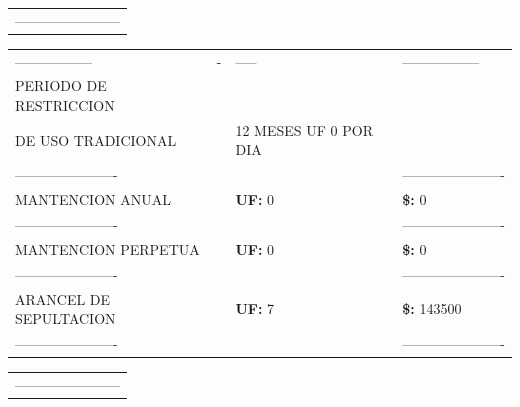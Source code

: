 \documentclass[10pt]{article}
\begin{document}
\begin{tabular}{l}
\color{white}----------------------- \\
\end{tabular}

\begin{tabular}{llll}
\hline
\color{white}----------------- & \color{white}- & \color{white}-----  & \color{white}----------------- \\
PERIODO DE RESTRICCION & & &\\ 
DE USO TRADICIONAL  & & 12 MESES UF 0 POR DIA \\ 
\color{white}---------------------- & & & \color{white}---------------------- \\
MANTENCION ANUAL &  & \textbf{UF: }0& \textbf{\$: }0 \\  
\color{white}---------------------- & & & \color{white}---------------------- \\
MANTENCION PERPETUA &  & \textbf{UF: }0 & \textbf{\$: }0 \\  
\color{white}---------------------- & & & \color{white}---------------------- \\
ARANCEL DE SEPULTACION &  & \textbf{UF: } 7& \textbf{\$: } 143500 \\  
\color{white}---------------------- & & & \color{white}---------------------- \\
\hline
\end{tabular}

\begin{tabular}{l}
\color{white}----------------------- \\
\end{tabular}
\end{document}
